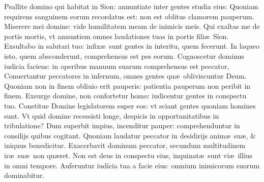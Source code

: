 \documentclass[a5paper,10pt]{book}
\def\ae{æ}
\begin{document}
\begin{multicols*}{2}
\newline \color{red} P\color{black}sallite domino qui habitat in Sion: annuntiate inter gentes studia eius:
\newline \color{red} Q\color{black}uoniam requirens sanguinem eorum recordatus est: non est oblitus clamorem pauperum.
\newline \color{red} M\color{black}iserere mei domine: vide humilitatem meam de inimicis meis.
\newline \color{red} Q\color{black}ui exaltas me de portis mortis, vt annuntiem omnes laudationes tuas in portis fili\ae \ Sion.
\newline \color{red} E\color{black}xsultabo in salutari tuo: infix\ae \ sunt gentes in interitu, quem fecerunt.
\newline \color{red} I\color{black}n laqueo isto, quem absconderunt, comprehensus est pes eorum.
\newline \color{red} C\color{black}ognoscetur dominus iudicia faciens: in operibus manuum suarum comprehensus est peccator, %
\newline \color{red} C\color{black}onuertantur peccatores in infernum, omnes gentes qu\ae \ obliviscuntur Deum.
\newline \color{red} Q\color{black}uoniam non in finem obliuio erit pauperis: patientia pauperum non peribit in finem.
\newline \color{red} E\color{black}xsurge domine, non confortetur homo: iudicentur gentes in conspectu tuo.
\newline \color{red} C\color{black}onstitue Domine legislatorem super eos: vt sciant gentes quoniam homines sunt.
\newline \color{red} V\color{black}t quid domine recessisti longe, despicis in opportunitatibus in tribulatione?
\newline \color{red} D\color{black}um superbit impius, incenditur pauper: comprehenduntur in consilijs quibus cogitant.
\newline \color{red} Q\color{black}uoniam laudatur peccator in desidirijs anim\ae \ su\ae , \& iniquus benedicitur.
\newline \color{red} E\color{black}xacerbavit dominum peccator, secundum multitudinem ir\ae \ su\ae \ non qu\ae ret.
\newline \color{red} N\color{black}on est deus in conspectu eius, inquinat\ae \ sunt vi\ae \ illius in omni tempore.
\newline \color{red} A\color{black}uferuntur iudícia tua a facie eius: omnium inimicorum suorum dominabitur.

\end{multicols*}
\end{document}
